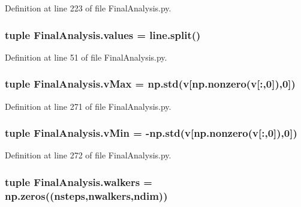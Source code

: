 Definition at line 223 of file Final\-Analysis.\-py.

\hypertarget{namespace_final_analysis_acd9913ccc0f466893ae0a193d0a17388}{
\subsubsection[{values}]{\setlength{\rightskip}{0pt plus 5cm}tuple Final\-Analysis.\-values = line.\-split()}}\label{namespace_final_analysis_acd9913ccc0f466893ae0a193d0a17388}


Definition at line 51 of file Final\-Analysis.\-py.

\hypertarget{namespace_final_analysis_a1876ad5867611d2150568c7311e8badb}{
\subsubsection[{v\-Max}]{\setlength{\rightskip}{0pt plus 5cm}tuple Final\-Analysis.\-v\-Max = np.\-std({\bf v}\mbox{[}np.\-nonzero({\bf v}\mbox{[}\-:,0\mbox{]}),0\mbox{]})}}\label{namespace_final_analysis_a1876ad5867611d2150568c7311e8badb}


Definition at line 271 of file Final\-Analysis.\-py.

\hypertarget{namespace_final_analysis_a5dff2737a91aa5a7c56b78a13ebf95ec}{
\subsubsection[{v\-Min}]{\setlength{\rightskip}{0pt plus 5cm}tuple Final\-Analysis.\-v\-Min = -\/np.\-std({\bf v}\mbox{[}np.\-nonzero({\bf v}\mbox{[}\-:,0\mbox{]}),0\mbox{]})}}\label{namespace_final_analysis_a5dff2737a91aa5a7c56b78a13ebf95ec}


Definition at line 272 of file Final\-Analysis.\-py.

\hypertarget{namespace_final_analysis_abcbb56dee8740482b79123ed446a959e}{
\subsubsection[{walkers}]{\setlength{\rightskip}{0pt plus 5cm}tuple Final\-Analysis.\-walkers = np.\-zeros(({\bf nsteps},{\bf nwalkers},{\bf ndim}))}}\label{namespace_final_analysis_abcbb56dee8740482b79123ed446a959e}


